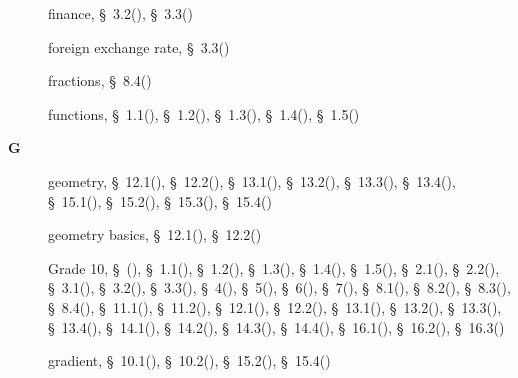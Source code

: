 \begin{multicols}{2}
{\begin{description}
	  \item[] \noindent\raggedright finance,  \S~3.2(\pageref{m39334}),  \S~3.3(\pageref{m39335})
	  
	  \item[] \noindent\raggedright foreign exchange rate,  \S~3.3(\pageref{m39335})
	  
	  \item[] \noindent\raggedright fractions,  \S~8.4(\pageref{m39392})
	  
	  \item[] \noindent\raggedright functions,  \S~1.1(\pageref{m39337}),  \S~1.2(\pageref{m39338}),  \S~1.3(\pageref{m39345}),  \S~1.4(\pageref{m39341}),  \S~1.5(\pageref{m39348})
	  \vspace{.3cm}
	  \item[{\large \bfseries G}]\noindent\raggedright
	  geometry,  \S~12.1(\pageref{m39370}),  \S~12.2(\pageref{m39368}),  \S~13.1(\pageref{m39354}),  \S~13.2(\pageref{m39352}),  \S~13.3(\pageref{m39357}),  \S~13.4(\pageref{m39358}),  \S~15.1(\pageref{m39107}),  \S~15.2(\pageref{m39108}),  \S~15.3(\pageref{m39119}),  \S~15.4(\pageref{m39167})
	  
	  \item[] \noindent\raggedright geometry basics,  \S~12.1(\pageref{m39370}),  \S~12.2(\pageref{m39368})
	  
	  \item[] \noindent\raggedright Grade 10,  \S~(\pageref{m38346}),  \S~1.1(\pageref{m39337}),  \S~1.2(\pageref{m39338}),  \S~1.3(\pageref{m39345}),  \S~1.4(\pageref{m39341}),  \S~1.5(\pageref{m39348}),  \S~2.1(\pageref{m39364}),  \S~2.2(\pageref{m39362}),  \S~3.1(\pageref{m39332}),  \S~3.2(\pageref{m39334}),  \S~3.3(\pageref{m39335}),  \S~4(\pageref{m38348}),  \S~5(\pageref{m38359}),  \S~6(\pageref{m38347}),  \S~7(\pageref{m38349}),  \S~8.1(\pageref{m39383}),  \S~8.2(\pageref{m39387}),  \S~8.3(\pageref{m39394}),  \S~8.4(\pageref{m39392}),  \S~11.1(\pageref{m39377}),  \S~11.2(\pageref{m39373}),  \S~12.1(\pageref{m39370}),  \S~12.2(\pageref{m39368}),  \S~13.1(\pageref{m39354}),  \S~13.2(\pageref{m39352}),  \S~13.3(\pageref{m39357}),  \S~13.4(\pageref{m39358}),  \S~14.1(\pageref{m39405}),  \S~14.2(\pageref{m39408}),  \S~14.3(\pageref{m39411}),  \S~14.4(\pageref{m39414}),  \S~16.1(\pageref{m39403}),  \S~16.2(\pageref{m39400}),  \S~16.3(\pageref{m39404})
	  
	  \item[] \noindent\raggedright gradient,  \S~10.1(\pageref{m39213}),  \S~10.2(\pageref{m39223}),  \S~15.2(\pageref{m39108}),  \S~15.4(\pageref{m39167})
	  

\end{description}}
\end{multicols}
